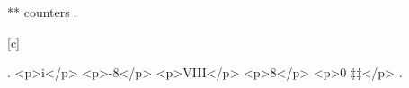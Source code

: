 ** counters
.

\addtocounter{c}{3 * -(2+1)}    %


\the\value{c}

[c]
\setcounter{a}{\value{c}}

.
<p>i</p>
<p>-8</p>
<p>VIII</p>
<p>8</p>
<p>0 ‡‡</p>
.
